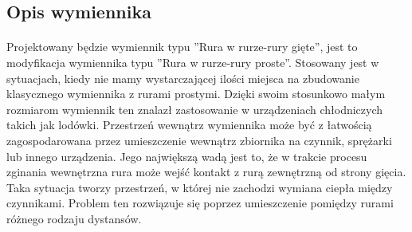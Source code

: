 \subsection{Opis wymiennika}

\paragraph{}{
    Projektowany będzie wymiennik typu ''Rura w rurze-rury gięte'', jest to modyfikacja wymiennika typu ''Rura w rurze-rury proste''.
    Stosowany jest w sytuacjach, kiedy nie mamy wystarczającej ilości miejsca na zbudowanie klasycznego wymiennika z rurami prostymi. Dzięki swoim stosunkowo małym rozmiarom wymiennik ten znalazł zastosowanie w urządzeniach chłodniczych takich jak lodówki.
    Przestrzeń wewnątrz wymiennika może być z łatwością zagospodarowana przez umieszczenie wewnątrz zbiornika na czynnik, sprężarki lub innego urządzenia.
    Jego największą wadą jest to, że w trakcie procesu zginania wewnętrzna rura może wejść kontakt z rurą zewnętrzną od strony gięcia.
    Taka sytuacja tworzy przestrzeń, w której nie zachodzi wymiana ciepła między czynnikami.
    Problem ten rozwiązuje się poprzez umieszczenie pomiędzy rurami różnego rodzaju dystansów.
}